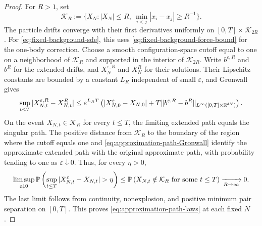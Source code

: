 \documentclass[11pt,reqno]{amsart}
\numberwithin{equation}{section}
\theoremstyle{plain}
\theoremstyle{remark}
\DeclarePairedDelimiter{\norm}{\lVert}{\rVert}
\renewcommand{\d}{\mathsf{d}}\newcommand{\s}{\mathsf{s}}
\begin{document}
\begin{proof}
For $R>1$, set
\begin{equation}\label{eq:approximation-compact-sets}
 \mathcal K_R:=\{X_N:|X_N|\le R,\ \min_{i<j}|x_i-x_j|\ge R^{-1}\}.
\end{equation}
The particle drifts converge with their first derivatives uniformly on $[0,T]\times\mathcal K_{2R}$. For \eqref{eq:fixed-background-sde}, this uses \eqref{eq:fixed-background-force-bound} for the one-body correction. Choose a smooth configuration-space cutoff equal to one on a neighborhood of $\mathcal K_R$ and supported in the interior of $\mathcal K_{2R}$. Write $b^{\varepsilon,R}$ and $b^R$ for the extended drifts, and $X_N^{\varepsilon,R}$ and $X_N^R$ for their solutions. Their Lipschitz constants are bounded by a constant $L_R$ independent of small $\varepsilon$, and Gronwall gives
\begin{equation}\label{eq:approximation-path-Gronwall}
 \sup_{t\le T}|X_{N,t}^{\varepsilon,R}-X_{N,t}^R|
 \le e^{L_RT}\left(|X_{N,0}^\varepsilon-X_{N,0}|
          +T\norm{b^{\varepsilon,R}-b^R}_{L^\infty([0,T]\times\R^{\d N})}\right).
\end{equation}
On the event $X_{N,t}\in\mathcal K_R$ for every $t\le T$, the limiting extended path equals the singular path. The positive distance from $\mathcal K_R$ to the boundary of the region where the cutoff equals one and \eqref{eq:approximation-path-Gronwall} identify the approximate extended path with the original approximate path, with probability tending to one as $\varepsilon\downarrow0$. Thus, for every $\eta>0$,
\begin{equation}\label{eq:approximation-path-probability}
 \limsup_{\varepsilon\downarrow0}
 \Pb\left(\sup_{t\le T}|X_{N,t}^\varepsilon-X_{N,t}|>\eta\right)
 \le\Pb\left(X_{N,t}\notin\mathcal K_R\text{ for some }t\le T\right)
 \xrightarrow[R\to\infty]{}0.
\end{equation}
The last limit follows from continuity, nonexplosion, and positive minimum pair separation on $[0,T]$. This proves \eqref{eq:approximation-path-laws} at each fixed $N$.


\end{proof}
\end{document}
